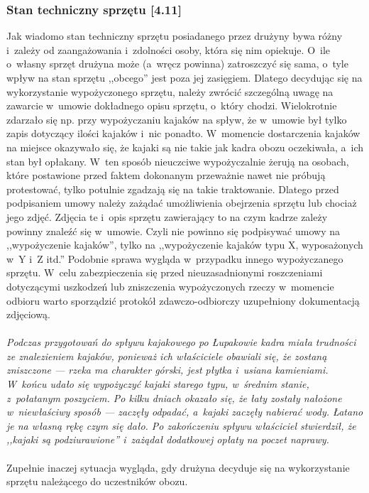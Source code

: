 \documentclass[a5paper,10pt,titlepage,twoside]{article}
\begin{document}
\subsubsection{Stan techniczny sprzętu [4.11]}
Jak wiadomo stan techniczny sprzętu posiadanego przez drużyny bywa różny i~zależy od zaangażowania i~zdolności osoby, która się nim opiekuje. O~ile o~własny sprzęt drużyna może (a~wręcz powinna) zatroszczyć się sama, o~tyle wpływ na stan sprzętu ,,obcego'' jest poza jej zasięgiem. Dlatego decydując się na wykorzystanie wypożyczonego sprzętu, należy zwrócić szczególną uwagę na zawarcie w~umowie dokładnego opisu sprzętu, o~który chodzi. Wielokrotnie zdarzało się np. przy wypożyczaniu kajaków na spływ, że w~umowie był tylko zapis dotyczący ilości kajaków i~nic ponadto. W~momencie dostarczenia kajaków na miejsce okazywało się, że kajaki są nie takie jak kadra obozu oczekiwała, a~ich stan był opłakany. W~ten sposób nieuczciwe wypożyczalnie żerują na osobach, które postawione przed faktem dokonanym przeważnie nawet nie próbują protestować, tylko potulnie zgadzają się na takie traktowanie. Dlatego przed podpisaniem umowy należy zażądać umożliwienia obejrzenia sprzętu lub chociaż jego zdjęć. Zdjęcia te i~opis sprzętu zawierający to na czym kadrze zależy powinny znaleźć się w~umowie. Czyli nie powinno się podpisywać umowy na ,,wypożyczenie kajaków'', tylko na ,,wypożyczenie kajaków typu X, wyposażonych w~Y i~Z itd.'' Podobnie sprawa wygląda w~przypadku innego wypożyczanego sprzętu. W~celu zabezpieczenia się przed nieuzasadnionymi roszczeniami dotyczącymi uszkodzeń lub zniszczenia wypożyczonych rzeczy w~momencie odbioru warto sporządzić protokół zdawczo-odbiorczy uzupełniony dokumentacją zdjęciową.
\\
\\
\small{
\emph{Podczas przygotowań do spływu kajakowego po Łupakowie kadra miała trudności ze znalezieniem kajaków, ponieważ ich właściciele obawiali się, że zostaną zniszczone --- rzeka ma charakter górski, jest płytka i~usiana kamieniami. W~końcu udało się wypożyczyć kajaki starego typu, w~średnim stanie, z~połatanym poszyciem. Po kilku dniach okazało się, że łaty zostały nałożone w~niewłaściwy sposób --- zaczęły odpadać, a~kajaki zaczęły nabierać wody. Łatano je na własną rękę czym się dało. Po zakończeniu spływu właściciel stwierdził, że ,,kajaki są podziurawione'' i~zażądał dodatkowej opłaty na poczet naprawy.}}
\\
\\
Zupełnie inaczej sytuacja wygląda, gdy drużyna decyduje się na wykorzystanie sprzętu należącego do uczestników obozu.
\end{document}
